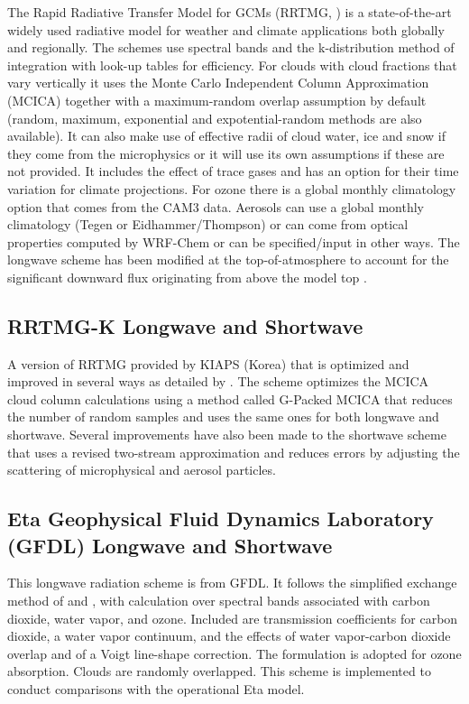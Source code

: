 The Rapid Radiative Transfer Model for GCMs (RRTMG, \citet{iacono08}) is a state-of-the-art
widely used radiative model for weather and climate applications both globally
and regionally. The schemes use spectral bands and the k-distribution method of
integration with look-up tables for efficiency. For clouds with cloud fractions that vary vertically it uses the 
Monte Carlo Independent Column Approximation (MCICA) together with a 
maximum-random overlap assumption by default (random, maximum, exponential and 
expotential-random methods are also available). It can also make use of effective radii
of cloud water, ice and snow if they come from the microphysics or it will use its
own assumptions if these are not provided. It includes the effect
of trace gases and has an option for their time variation for climate projections.
For ozone there is a global monthly climatology option that comes from the CAM3 data.
Aerosols can use a global monthly climatology (Tegen or Eidhammer/Thompson) or can come from
optical properties computed by WRF-Chem or can be specified/input in other ways. The longwave scheme has been
modified at the top-of-atmosphere to account for the significant downward flux originating from 
above the model top \citep{cavallo11}.

\subsection {RRTMG-K Longwave and Shortwave}

A version of RRTMG provided by KIAPS (Korea) that is optimized and improved in several ways as detailed
by \citet{baek17}. The scheme optimizes the MCICA cloud column calculations using a method called G-Packed
MCICA that reduces the number of random samples and uses the same ones for both longwave and shortwave.
Several improvements have also been made to the shortwave scheme that uses a revised two-stream
approximation and reduces errors by adjusting the scattering of microphysical and aerosol particles.
 
\subsection {Eta Geophysical Fluid Dynamics Laboratory (GFDL) Longwave and Shortwave}

This longwave radiation scheme is from GFDL. It follows the simplified exchange 
method of \citet{fels75} and \citet{schwarzkopf91}, 
with calculation over spectral bands associated with carbon dioxide, water vapor, 
and ozone. Included are \citet{schwarzkopf85} transmission coefficients for carbon 
dioxide, a \citet{roberts76} water vapor continuum, and the effects of 
water vapor-carbon dioxide overlap and of a Voigt line-shape correction.
The \citet{rodgers68} formulation is adopted for ozone absorption. 
Clouds are randomly overlapped. 
This scheme is implemented to conduct comparisons with the operational Eta model.

